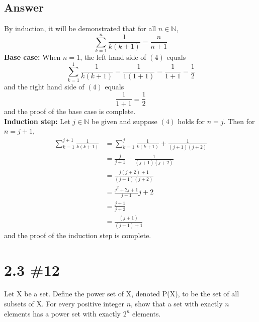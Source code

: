 \documentclass[
	12pt, %
]{fphw}
\newcommand\qed{\text{$\blacksquare$}}
\newcommand\N{\mathbb{N}}
\begin{document}
\subsection*{Answer} By induction, it will be demonstrated that for all $n \in \N{}$,
\begin{equation}
\sum^n_{k = 1} \frac{1}{k(k+1)} = \frac{n}{n+1}
\end{equation}
\textbf{Base case:} When $n = 1$, the left hand side of $(4)$ equals
$$
\sum^1_{k = 1} \frac{1}{k(k+1)} =  \frac{1}{1(1+1)} = \frac{1}{1+1} = \frac{1}{2}
$$
and the right hand side of $(4)$ equals
$$
\frac{1}{1+1} = \frac{1}{2}
$$
and the proof of the base case is complete.\\
\textbf{Induction step:} Let $j \in \N{}$ be given and suppose $(4)$ holds for $n = j$. Then for $n = j+1$,
\begin{align*}
\sum^{j+1}_{k = 1} \frac{1}{k(k+1)} &= \sum^{j}_{k = 1} \frac{1}{k(k+1)} + \frac{1}{(j+1)(j+2)}\\
&=  \frac{j}{j+1} +  \frac{1}{(j+1)(j+2)}\\
&= \frac{j(j+2) + 1}{(j+1)(j+2)}\\
&= \frac{j^2 + 2j + 1}{j+1}{j+2}\\
&= \frac{j+1}{j+2}\\
&= \frac{(j+1)}{(j+1)+1}
\end{align*}
and the proof of the induction step is complete. \qed

\newpage
\section*{2.3 \#12}

\begin{problem}
Let X be a set. Define the power set of X, denoted P(X), to be the set of all subsets of X. For every positive integer $n$, show that a set with exactly $n$ elements has a power set with exactly $2^n$ elements.

\end{problem}

\end{document}
